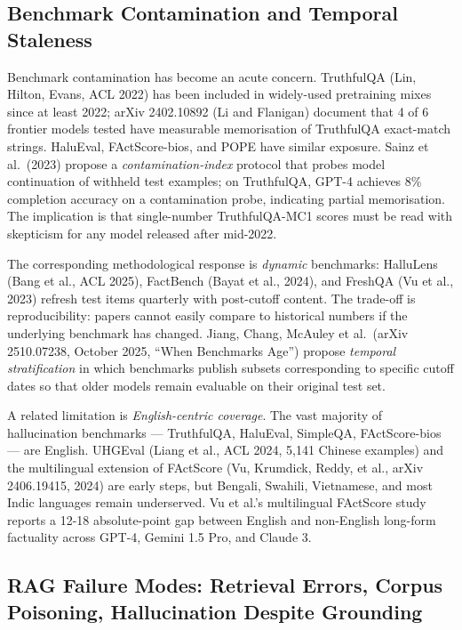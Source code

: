 \subsection{Benchmark Contamination and Temporal Staleness}\label{benchmark-contamination-and-temporal-staleness}

Benchmark contamination has become an acute concern. TruthfulQA (Lin, Hilton, Evans, ACL 2022) has been included in widely-used pretraining mixes since at least 2022; arXiv 2402.10892 (Li and Flanigan) document that 4 of 6 frontier models tested have measurable memorisation of TruthfulQA exact-match strings. HaluEval, FActScore-bios, and POPE have similar exposure. Sainz et al.~(2023) propose a \emph{contamination-index} protocol that probes model continuation of withheld test examples; on TruthfulQA, GPT-4 achieves 8\% completion accuracy on a contamination probe, indicating partial memorisation. The implication is that single-number TruthfulQA-MC1 scores must be read with skepticism for any model released after mid-2022.

The corresponding methodological response is \emph{dynamic} benchmarks: HalluLens (Bang et al., ACL 2025), FactBench (Bayat et al., 2024), and FreshQA (Vu et al., 2023) refresh test items quarterly with post-cutoff content. The trade-off is reproducibility: papers cannot easily compare to historical numbers if the underlying benchmark has changed. Jiang, Chang, McAuley et al.~(arXiv 2510.07238, October 2025, ``When Benchmarks Age'') propose \emph{temporal stratification} in which benchmarks publish subsets corresponding to specific cutoff dates so that older models remain evaluable on their original test set.

A related limitation is \emph{English-centric coverage}. The vast majority of hallucination benchmarks --- TruthfulQA, HaluEval, SimpleQA, FActScore-bios --- are English. UHGEval (Liang et al., ACL 2024, 5,141 Chinese examples) and the multilingual extension of FActScore (Vu, Krumdick, Reddy, et al., arXiv 2406.19415, 2024) are early steps, but Bengali, Swahili, Vietnamese, and most Indic languages remain underserved. Vu et al.'s multilingual FActScore study reports a 12-18 absolute-point gap between English and non-English long-form factuality across GPT-4, Gemini 1.5 Pro, and Claude 3.

\subsection{RAG Failure Modes: Retrieval Errors, Corpus Poisoning, Hallucination Despite Grounding}\label{rag-failure-modes-retrieval-errors-corpus-poisoning-hallucination-despite-grounding}

